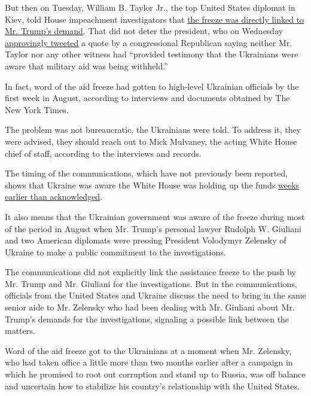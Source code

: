 But then on Tuesday, William B. Taylor Jr., the top United States
diplomat in Kiev, told House impeachment investigators that
\href{https://www.nytimes.com/2019/10/22/us/trump-impeachment-ukraine.html}{the
freeze was directly linked to Mr. Trump's demand}. That did not deter
the president, who on Wednesday
\href{https://twitter.com/realDonaldTrump/status/1186968579125792768?s=20}{approvingly
tweeted} a quote by a congressional Republican saying neither Mr. Taylor
nor any other witness had ``provided testimony that the Ukrainians were
aware that military aid was being withheld.''

In fact, word of the aid freeze had gotten to high-level Ukrainian
officials by the first week in August, according to interviews and
documents obtained by The New York Times.

The problem was not bureaucratic, the Ukrainians were told. To address
it, they were advised, they should reach out to Mick Mulvaney, the
acting White House chief of staff, according to the interviews and
records.

The timing of the communications, which have not previously been
reported, shows that Ukraine was aware the White House was holding up
the funds
\href{https://www.nytimes.com/2019/09/22/world/europe/ukraine-trump-military-aid.html}{weeks
earlier than acknowledged}.

It also means that the Ukrainian government was aware of the freeze
during most of the period in August when Mr. Trump's personal lawyer
Rudolph W. Giuliani and two American diplomats were pressing President
Volodymyr Zelensky of Ukraine to make a public commitment to the
investigations.

The communications did not explicitly link the assistance freeze to the
push by Mr. Trump and Mr. Giuliani for the investigations. But in the
communications, officials from the United States and Ukraine discuss the
need to bring in the same senior aide to Mr. Zelensky who had been
dealing with Mr. Giuliani about Mr. Trump's demands for the
investigations, signaling a possible link between the matters.

Word of the aid freeze got to the Ukrainians at a moment when Mr.
Zelensky, who had taken office a little more than two months earlier
after a campaign in which he promised to root out corruption and stand
up to Russia, was off balance and uncertain how to stabilize his
country's relationship with the United States.

